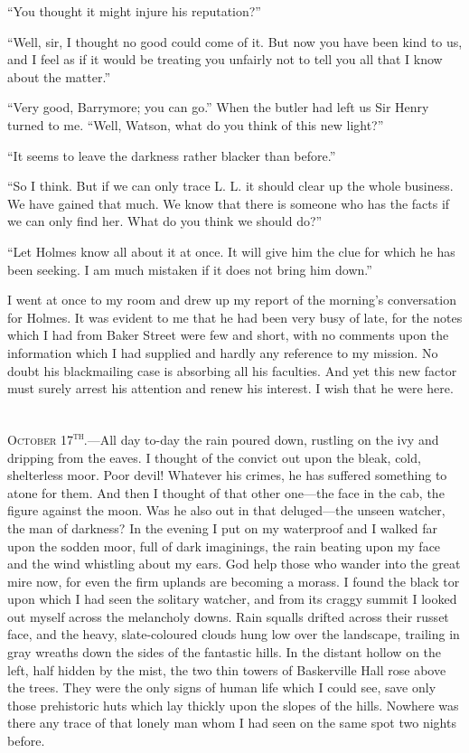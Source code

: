 \enquote{You thought it might injure his reputation?}

\enquote{Well, sir, I thought no good could come of it. But now you have been kind to us, and I feel as if it would be treating you unfairly not to tell you all that I know about the matter.}

\enquote{Very good, Barrymore; you can go.} When the butler had left us Sir Henry turned to me. \enquote{Well, Watson, what do you think of this new light?}

\enquote{It seems to leave the darkness rather blacker than before.}

\enquote{So I think. But if we can only trace L. L. it should clear up the whole business. We have gained that much. We know that there is someone who has the facts if we can only find her. What do you think we should do?}

\enquote{Let Holmes know all about it at once. It will give him the clue for which he has been seeking. I am much mistaken if it does not bring him down.}

I went at once to my room and drew up my report of the morning's conversation for Holmes. It was evident to me that he had been very busy of late, for the notes which I had from Baker Street were few and short, with no comments upon the information which I had supplied and hardly any reference to my mission. No doubt his blackmailing case is absorbing all his faculties. And yet this new factor must surely arrest his attention and renew his interest. I wish that he were here.

~\\

\textsc{October 17\textsuperscript{th}.}---All day to-day the rain poured down, rustling on the ivy and dripping from the eaves. I thought of the convict out upon the bleak, cold, shelterless moor. Poor devil! Whatever his crimes, he has suffered something to atone for them. And then I thought of that other one---the face in the cab, the figure against the moon. Was he also out in that deluged---the unseen watcher, the man of darkness? In the evening I put on my waterproof and I walked far upon the sodden moor, full of dark imaginings, the rain beating upon my face and the wind whistling about my ears. God help those who wander into the great mire now, for even the firm uplands are becoming a morass. I found the black tor upon which I had seen the solitary watcher, and from its craggy summit I looked out myself across the melancholy downs. Rain squalls drifted across their russet face, and the heavy, slate-coloured clouds hung low over the landscape, trailing in gray wreaths down the sides of the fantastic hills. In the distant hollow on the left, half hidden by the mist, the two thin towers of Baskerville Hall rose above the trees. They were the only signs of human life which I could see, save only those prehistoric huts which lay thickly upon the slopes of the hills. Nowhere was there any trace of that lonely man whom I had seen on the same spot two nights before.

